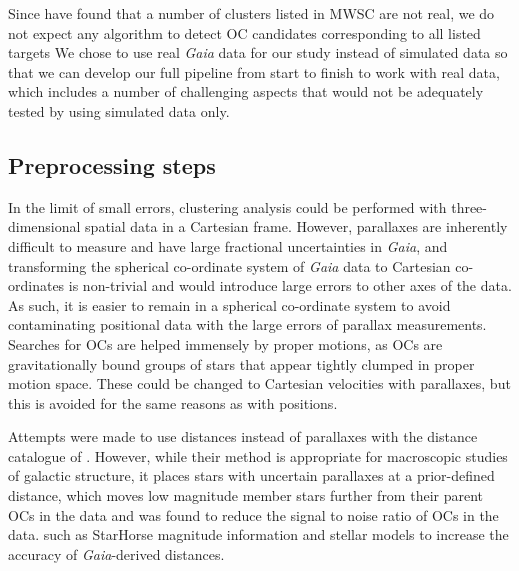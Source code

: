 \emph{} Since \cite{cantat-gaudin_clusters_2020} have found that a number of clusters listed in MWSC are not real, we do not expect any algorithm to detect OC candidates corresponding to all listed targets\emph{} We chose to use real \emph{Gaia} data for our study instead of simulated data so that we can develop our full pipeline from start to finish to work with real data, which includes a number of challenging aspects \cite[such as systematic errors on astrometric parameters,][]{lindegren_gaia_2018} that would not be adequately tested by using simulated data only.


\subsection{Preprocessing steps}

In the limit of small errors, clustering analysis could be performed with three-dimensional spatial data in a Cartesian frame. However, parallaxes are inherently difficult to measure and have large fractional uncertainties in \emph{Gaia}, and transforming the spherical co-ordinate system of \emph{Gaia} data to Cartesian co-ordinates is non-trivial and would introduce large errors to other axes of the data. As such, it is easier to remain in a spherical co-ordinate system to avoid contaminating positional data with the large errors of parallax measurements. Searches for OCs are helped immensely by proper motions, as OCs are gravitationally bound groups of stars that appear tightly clumped in proper motion space. These could be changed to Cartesian velocities with parallaxes, but this is avoided for the same reasons as with positions. 

Attempts were made to use distances instead of parallaxes with the distance catalogue of \cite{bailer-jones_estimating_2018}. However, while their method is appropriate for macroscopic studies of galactic structure, it places stars with uncertain parallaxes at a prior-defined distance, which moves low magnitude member stars further from their parent OCs in the data and was found to reduce the signal to noise ratio of OCs in the data. such as StarHorse \citep{anders_photo-astrometric_2019} magnitude information and stellar models to increase the accuracy of \emph{Gaia}-derived distances.

